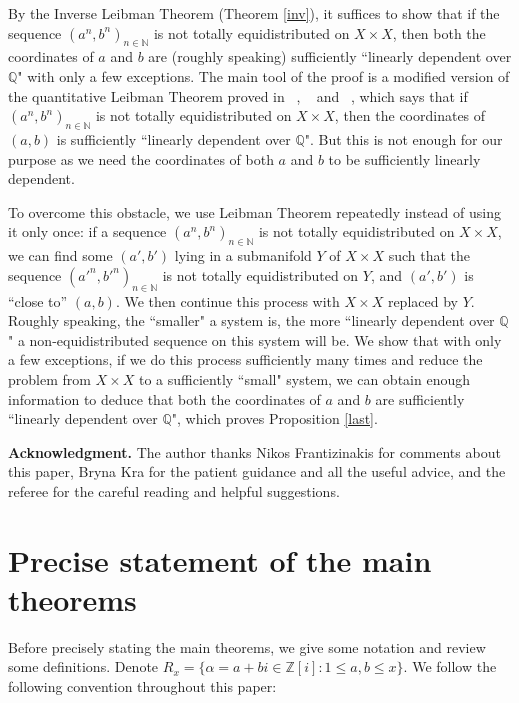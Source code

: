 \documentclass[12pt,amstex]{amsart}
\theoremstyle{definition}
\def \Z {\mathbb{Z}[i]}
\def \N {\mathbb{N}}
\def \A {\alpha}
\begin{document}
  By the Inverse Leibman Theorem (Theorem \ref{inv}), it suffices to show that if the sequence $(a^{n},b^{n})_{n\in\N}$ is not totally equidistributed on $X\times X$, then
  both the coordinates of $a$ and $b$ are (roughly speaking) sufficiently ``linearly dependent over $\mathbb{Q}$"  with only a few exceptions.
  The main tool of the proof is a modified version of the quantitative Leibman Theorem proved in ~\cite{er}, ~\cite{er2} and ~\cite{GT}, which says that if $(a^{n},b^{n})_{n\in\N}$ is not totally equidistributed on $X\times X$, then the coordinates of $(a,b)$ is sufficiently ``linearly dependent over $\mathbb{Q}$". But this is not enough for our purpose as we need the coordinates of both $a$ and $b$ to be sufficiently linearly dependent.

  To overcome this obstacle, we use Leibman Theorem repeatedly instead of using it only once: if a sequence $(a^{n},b^{n})_{n\in\N}$ is not totally equidistributed on $X\times X$,
  we can find some $(a',b')$ lying in a submanifold $Y$ of $X\times X$ such that the sequence $(a'^{n},b'^{n})_{n\in\N}$ is not totally equidistributed on $Y$, and $(a',b')$ is ``close to'' $(a,b)$. We then continue this process with $X\times X$ replaced by $Y$. Roughly speaking, the ``smaller" a system is, the more ``linearly dependent over $\mathbb{Q}$" a non-equidistributed sequence on this system will be. We show that with only a few exceptions, if we do this process sufficiently many times and reduce the problem from $X\times X$ to a sufficiently ``small" system, we can obtain enough information to deduce that both the coordinates of $a$ and $b$ are sufficiently ``linearly dependent over $\mathbb{Q}$", which proves Proposition \ref{last}.

\textbf{Acknowledgment.} The author thanks Nikos Frantizinakis for comments about this paper, Bryna Kra for the patient guidance and all the useful advice, and the referee for the careful reading and helpful suggestions.

\section{Precise statement of the main theorems}
Before precisely stating the main theorems, we give some notation and review some definitions.
Denote $R_{x}=\{\A=a+bi\in\Z\colon 1\leq a, b\leq x\}$.
We follow the following convention throughout this paper:
\end{document}
